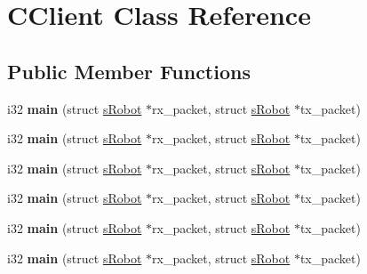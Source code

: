 \hypertarget{classCClient}{\section{C\-Client Class Reference}
\label{classCClient}
}
\subsection*{Public Member Functions}
\begin{DoxyCompactItemize}
\item 
\hypertarget{classCClient_a9714ac6543f0f539fbb7036f60807cd0}{i32 {\bfseries main} (struct \hyperlink{structsRobot}{s\-Robot} $\ast$rx\-\_\-packet, struct \hyperlink{structsRobot}{s\-Robot} $\ast$tx\-\_\-packet)}\label{classCClient_a9714ac6543f0f539fbb7036f60807cd0}

\item 
\hypertarget{classCClient_a9714ac6543f0f539fbb7036f60807cd0}{i32 {\bfseries main} (struct \hyperlink{structsRobot}{s\-Robot} $\ast$rx\-\_\-packet, struct \hyperlink{structsRobot}{s\-Robot} $\ast$tx\-\_\-packet)}\label{classCClient_a9714ac6543f0f539fbb7036f60807cd0}

\item 
\hypertarget{classCClient_a9714ac6543f0f539fbb7036f60807cd0}{i32 {\bfseries main} (struct \hyperlink{structsRobot}{s\-Robot} $\ast$rx\-\_\-packet, struct \hyperlink{structsRobot}{s\-Robot} $\ast$tx\-\_\-packet)}\label{classCClient_a9714ac6543f0f539fbb7036f60807cd0}

\item 
\hypertarget{classCClient_a9714ac6543f0f539fbb7036f60807cd0}{i32 {\bfseries main} (struct \hyperlink{structsRobot}{s\-Robot} $\ast$rx\-\_\-packet, struct \hyperlink{structsRobot}{s\-Robot} $\ast$tx\-\_\-packet)}\label{classCClient_a9714ac6543f0f539fbb7036f60807cd0}

\item 
\hypertarget{classCClient_a9714ac6543f0f539fbb7036f60807cd0}{i32 {\bfseries main} (struct \hyperlink{structsRobot}{s\-Robot} $\ast$rx\-\_\-packet, struct \hyperlink{structsRobot}{s\-Robot} $\ast$tx\-\_\-packet)}\label{classCClient_a9714ac6543f0f539fbb7036f60807cd0}

\item 
\hypertarget{classCClient_a9714ac6543f0f539fbb7036f60807cd0}{i32 {\bfseries main} (struct \hyperlink{structsRobot}{s\-Robot} $\ast$rx\-\_\-packet, struct \hyperlink{structsRobot}{s\-Robot} $\ast$tx\-\_\-packet)}\label{classCClient_a9714ac6543f0f539fbb7036f60807cd0}

\end{DoxyCompactItemize}


